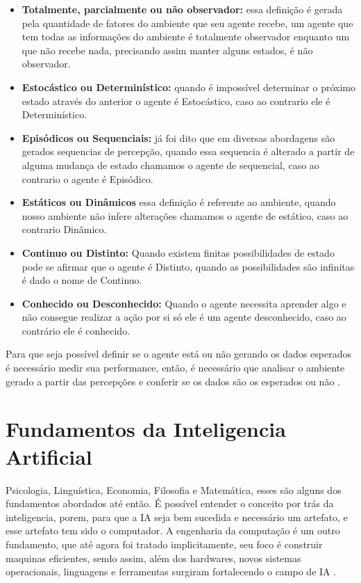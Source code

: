 \documentclass[
	12pt,				%
	openright,			%
	twoside,			%
	a4paper,			%
	english,			%
	french,				%
	spanish,			%
	brazil				%
	]{abntex2}
\begin{document}
\begin{itemize}
 \item \textbf{Totalmente, parcialmente ou não observador:} essa definição é gerada pela quantidade de fatores do ambiente que seu agente recebe, um agente que tem todas as informações do ambiente é totalmente observador enquanto um que não recebe nada, precisando assim manter alguns estados, é não observador.
 \item \textbf{Estocástico ou Determinístico:} quando é impossível determinar o próximo estado através do anterior o agente é Estocástico, caso ao contrario ele é Determinístico.
 \item \textbf{Episódicos ou Sequenciais:} já foi dito que em diversas abordagens são gerados sequencias de percepção, quando essa sequencia é alterado a partir de alguma mudança de estado chamamos o agente de sequencial, caso ao contrario o agente é Episódico.
 \item \textbf{Estáticos ou Dinâmicos} essa definição é referente ao ambiente, quando nosso ambiente não infere alterações chamamos o agente de estático, caso ao contrario Dinâmico.
 \item \textbf{Continuo ou Distinto:} Quando existem finitas possibilidades de estado pode se afirmar que o agente é Distinto, quando as possibilidades são infinitas é dado o nome de Continuo.
 \item \textbf{Conhecido ou Desconhecido:} Quando o agente necessita aprender algo e não consegue realizar a ação por si só ele é um agente desconhecido, caso ao contrário ele é conhecido.
\end{itemize}

Para que seja possível definir se o agente está ou não gerando os dados esperados é necessário medir sua performance, então, é necessário que analisar o ambiente gerado a partir das percepções e conferir se os dados são os esperados ou não \cite[294-295]{frege1956thought}.

\section{Fundamentos da Inteligencia Artificial}

Psicologia, Linguística, Economia, Filosofia e Matemática, esses são alguns dos fundamentos abordados até então. É possível entender o conceito por trás da inteligencia, porem, para que a IA seja bem sucedida e necessário um artefato, e esse artefato tem sido o computador. A engenharia da computação é um outro fundamento, que até agora foi tratado implicitamente, seu foco é construir maquinas eficientes, sendo assim, além dos hardwares, novos sistemas operacionais, linguagens e ferramentas surgiram fortalecendo o campo de IA \cite[13-14]{russell2003artificial}.
\end{document}
